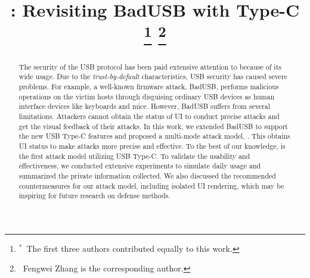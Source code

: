 \documentclass[conference]{IEEEtran}
\begin{document}
\title{\tool: Revisiting BadUSB with Type-C\\
\thanks{$^{*}$~The first three authors contributed equally to this work.}
\thanks{\textsuperscript{\Letter}~Fengwei Zhang is the corresponding author.}}


\author{
}

\maketitle
\thispagestyle{plain}
\pagestyle{plain}



\begin{abstract}

The security of the \ac{USB} protocol has been paid extensive attention to because of its
    wide usage.  Due to the \textit{trust-by-default} characteristics, \ac{USB}
    security has caused severe problems.  For example, a well-known firmware
    attack, BadUSB, performs malicious operations on the victim hosts through
    disguising ordinary \ac{USB} devices as human interface devices like keyboards and
    mice.  However, BadUSB suffers from several limitations.  Attackers cannot
    obtain the status of \ac{UI} to conduct precise attacks and get the visual feedback of their attacks.  In this work, we
    extended BadUSB to support the new \ac{USB} Type-C features and proposed a
    multi-mode attack model, \tool.  This obtains UI status to make attacks more 
    precise and effective.  To the best of our knowledge, \tool is the first attack model
    utilizing \ac{USB} Type-C.  To validate the usability and effectiveness, we
    conducted extensive experiments to simulate daily usage and summarized the private information collected.
We also discussed the recommended countermeasures for our attack model,
    including isolated UI rendering, which may be inspiring for future research
    on defense methods.
\end{abstract}
\end{document}
